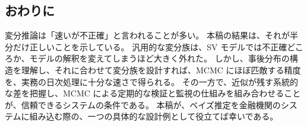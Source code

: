 \subsection{おわりに}\label{sec:conc-closing}

変分推論は「速いが不正確」と言われることが多い。
本稿の結果は、それが半分だけ正しいことを示している。
汎用的な変分族は、SV モデルでは不正確どころか、モデルの解釈を変えてしまうほど大きく外れた。
しかし、事後分布の構造を理解し、それに合わせて変分族を設計すれば、MCMC にほぼ匹敵する精度を、実務の日次処理に十分な速さで得られる。
その一方で、近似が残す系統的な差を把握し、MCMC による定期的な検証と監視の仕組みを組み合わせることが、信頼できるシステムの条件である。
本稿が、ベイズ推定を金融機関のシステムに組み込む際の、一つの具体的な設計例として役立てば幸いである。
